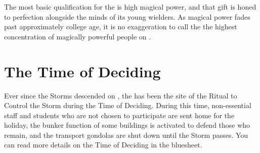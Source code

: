 \documentclass[blue]{GL2020}
\begin{document}
The most basic qualification for the \pSc{} is high magical power, and that gift is honed to perfection alongside the minds of its young wielders. As magical power fades past approximately college age, it is no exaggeration to call the \pSchool{} the highest concentration of magically powerful people on \pEarth{}.

\section*{The Time of Deciding}
Ever since the Storms descended on \pEarth{}, the \pSc{} has been the site of the Ritual to Control the Storm during the Time of Deciding. During this time, non-essential staff and students who are not chosen to participate are sent home for the holiday, the bunker function of some buildings is activated to defend those who remain, and the transport gondolas are shut down until the Storm passes. You can read more details on the Time of Deciding in the \bWorld{} bluesheet.
\end{document}
